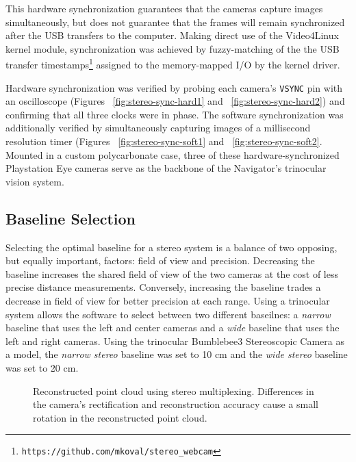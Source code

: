 \documentclass[twocolumn,11pt]{article}
\begin{document}
This hardware synchronization guarantees that the cameras capture images
simultaneously, but does not guarantee that the frames will remain synchronized
after the USB transfers to the computer. Making direct use of the Video4Linux
kernel module, synchronization was achieved by fuzzy-matching of the the USB
transfer timestamps\footnote{\texttt{https://github.com/mkoval/stereo\_webcam}}
assigned to the memory-mapped I/O by the kernel driver.

Hardware synchronization was verified by probing each camera's \texttt{VSYNC}
pin with an oscilloscope (Figures ~\ref{fig:stereo-sync-hard1} and
~\ref{fig:stereo-sync-hard2}) and confirming that all three clocks were in
phase. The software synchronization was additionally verified by simultaneously
capturing images of a millisecond resolution timer (Figures
~\ref{fig:stereo-sync-soft1} and ~\ref{fig:stereo-sync-soft2}. Mounted in a
custom polycarbonate case, three of these hardware-synchronized Playstation Eye
cameras serve as the backbone of the Navigator's trinocular vision system.

\subsection{Baseline Selection}
\label{sec:stereo-mux}
Selecting the optimal baseline for a stereo system is a balance of two
opposing, but equally important, factors: field of view and precision.
Decreasing the baseline increases the shared field of view of the two cameras
at the cost of less precise distance measurements. Conversely, increasing the
baseline trades a decrease in field of view for better precision at each
range. Using a trinocular system allows the software to select between
two different baseilnes: a \textit{narrow} baseline that uses the left and
center cameras and a \textit{wide} baseline that uses the left and right
cameras. Using the trinocular Bumblebee3 Stereoscopic Camera as a model, the
\textit{narrow stereo} baseline was set to 10 cm and the \textit{wide stereo}
baseline was set to 20 cm.

\begin{figure*}
	\centering
	\caption{
		Reconstructed point cloud using stereo multiplexing. Differences in the
		camera's rectification and reconstruction accuracy cause a small
		rotation in the reconstructed point cloud.
	}
	\label{fig:stereo-dist}
\end{figure*}
\end{document}
